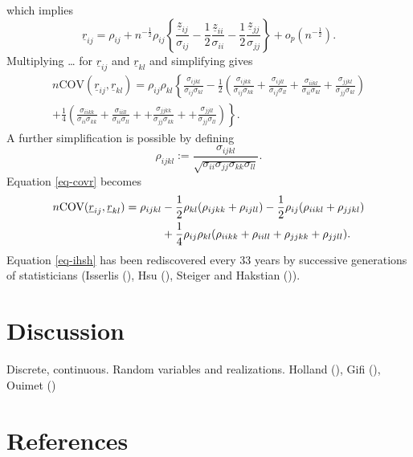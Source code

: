 \documentclass[
  12pt,
  letterpaper,
  DIV=11,
  numbers=noendperiod]{scrartcl}
\newcommand{\sectionbreak}{\clearpage}
\newcommand{\ul}[1]{\underline{#1}}
\begin{document}
which implies \[
\ul{r}_{ij}=\rho_{ij}+n^{-\frac12}\rho_{ij}\left\{\frac{\ul{z}_{ij}}{\sigma_{ij}}-\frac12\frac{\ul{z}_{ii}}{\sigma_{ii}}-\frac12\frac{\ul{z}_{jj}}{\sigma_{jj}}\right\}+o_p(n^{-\frac12}).
\] Multiplying \ldots{} for \(\ul{r}_{ij}\) and \(\ul{r}_{kl}\) and
simplifying gives \begin{multline}
n\text{COV}(\ul{r}_{ij},\ul{r}_{kl})=
\rho_{ij}\rho_{kl}\left\{\frac{\sigma_{ijkl}}{\sigma_{ij}\sigma_{kl}}
-\frac12\left(\frac{\sigma_{ijkk}}{\sigma_{ij}\sigma_{kk}}
+\frac{\sigma_{ijll}}{\sigma_{ij}\sigma_{ll}}
+\frac{\sigma_{iikl}}{\sigma_{ii}\sigma_{kl}}
+\frac{\sigma_{jjkl}}{\sigma_{jj}\sigma_{kl}}\right)\right.\\
\left.+\frac14\left(\frac{\sigma_{iikk}}{\sigma_{ii}\sigma_{kk}}
+\frac{\sigma_{iill}}{\sigma_{ii}\sigma_{ll}}+
+\frac{\sigma_{jjkk}}{\sigma_{jj}\sigma_{kk}}+
+\frac{\sigma_{jjll}}{\sigma_{jj}\sigma_{ll}}\right)\right\}.\label{eq-covr}
\end{multline} A further simplification is possible by defining
\begin{equation}
\rho_{ijkl}:=\frac{\sigma_{ijkl}}{\sqrt{\sigma_{ii}\sigma_{jj}\sigma_{kk}\sigma_{ll}}}.
\label{eq-normcor}
\end{equation} Equation \eqref{eq-covr} becomes \begin{align}
n\text{COV}(\ul{r}_{ij},\ul{r}_{kl})=\rho_{ijkl}&-\frac12\rho_{kl}(\rho_{ijkk}+\rho_{ijll})-\frac12
\rho_{ij}(\rho_{iikl}+\rho_{jjkl})\notag\\&+\frac14\rho_{ij}\rho_{kl}(\rho_{iikk}+\rho_{iill}+\rho_{jjkk}+\rho_{jjll}).\label{eq-ihsh}
\end{align} Equation \eqref{eq-ihsh} has been rediscovered every 33
years by successive generations of statisticians (Isserlis
(), Hsu (),
Steiger and Hakstian ()).

\sectionbreak

\section{Discussion}\label{discussion}

Discrete, continuous. Random variables and realizations. Holland
(), Gifi
(), Ouimet
()

\sectionbreak

\section*{References}\label{references}
\end{document}
